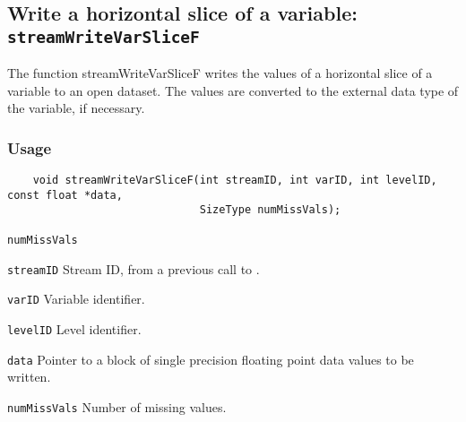 \subsection{Write a horizontal slice of a variable: \texttt{streamWriteVarSliceF}}
\label{streamWriteVarSliceF}

The function streamWriteVarSliceF writes the values of a horizontal slice of a variable to an open dataset.
The values are converted to the external data type of the variable, if necessary.
\subsubsection*{Usage}

\begin{verbatim}
    void streamWriteVarSliceF(int streamID, int varID, int levelID, const float *data, 
                              SizeType numMissVals);
\end{verbatim}

\hspace*{4mm}\begin{minipage}[]{15cm}
\begin{deflist}{\texttt{numMissVals}\ }
\item[\texttt{streamID}]
Stream ID, from a previous call to {}.
\item[\texttt{varID}]
Variable identifier.
\item[\texttt{levelID}]
Level identifier.
\item[\texttt{data}]
Pointer to a block of single precision floating point data values to be written.
\item[\texttt{numMissVals}]
Number of missing values.

\end{deflist}
\end{minipage}
